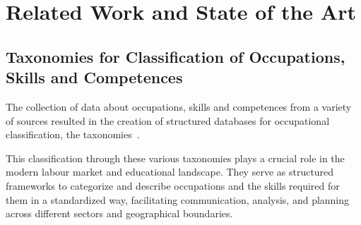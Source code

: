 \chapter{Related Work and State of the Art}
\label{chapter:related work}

\section{Taxonomies for Classification of Occupations, Skills and Competences}

The collection of data about occupations, skills and competences from a variety of sources resulted in the creation of structured databases for occupational classification, the taxonomies~\cite{CHIARELLO2021121177}. 

This classification through these various taxonomies plays a crucial role in the modern labour market and educational landscape. They serve as structured frameworks to categorize and describe occupations and the skills required for them in a standardized way, facilitating communication, analysis, and planning across different sectors and geographical boundaries.

